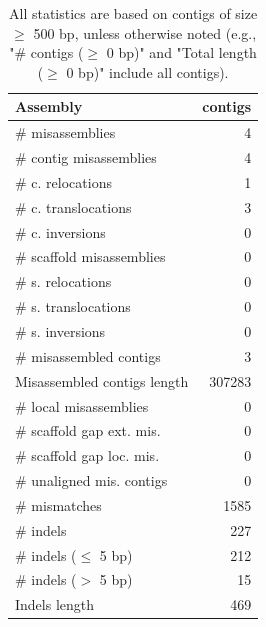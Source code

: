 \documentclass[12pt,a4paper]{article}
\begin{document}
\begin{table}[ht]
\begin{center}
\caption{All statistics are based on contigs of size $\geq$ 500 bp, unless otherwise noted (e.g., "\# contigs ($\geq$ 0 bp)" and "Total length ($\geq$ 0 bp)" include all contigs).}
\begin{tabular}{|l*{1}{|r}|}
\hline
Assembly & contigs \\ \hline
\# misassemblies & 4 \\ \hline
\hspace{2mm}\# contig misassemblies & 4 \\ \hline
\hspace{5mm}\# c. relocations & 1 \\ \hline
\hspace{5mm}\# c. translocations & 3 \\ \hline
\hspace{5mm}\# c. inversions & 0 \\ \hline
\hspace{2mm}\# scaffold misassemblies & 0 \\ \hline
\hspace{5mm}\# s. relocations & 0 \\ \hline
\hspace{5mm}\# s. translocations & 0 \\ \hline
\hspace{5mm}\# s. inversions & 0 \\ \hline
\# misassembled contigs & 3 \\ \hline
Misassembled contigs length & 307283 \\ \hline
\# local misassemblies & 0 \\ \hline
\# scaffold gap ext. mis. & 0 \\ \hline
\# scaffold gap loc. mis. & 0 \\ \hline
\# unaligned mis. contigs & 0 \\ \hline
\# mismatches & 1585 \\ \hline
\# indels & 227 \\ \hline
\hspace{5mm}\# indels ($\leq$ 5 bp) & 212 \\ \hline
\hspace{5mm}\# indels ($>$ 5 bp) & 15 \\ \hline
Indels length & 469 \\ \hline
\end{tabular}
\end{center}
\end{table}
\end{document}
